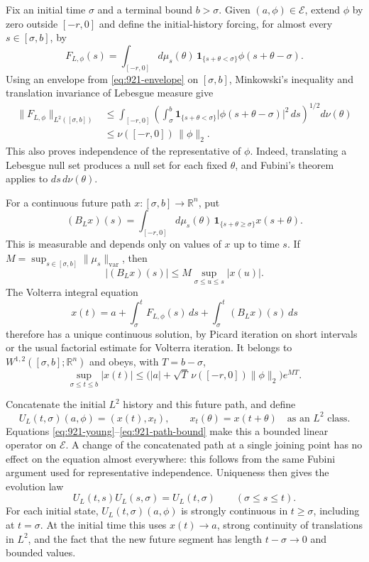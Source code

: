 \documentclass[11pt,a4paper]{article}
\theoremstyle{remark}
\begin{document}
Fix an initial time $\sigma$ and a terminal bound $b>\sigma$. Given
$(a,\phi)\in\mathcal E$, extend $\phi$ by zero outside $[-r,0]$ and define
the initial-history forcing, for almost every $s\in[\sigma,b]$, by
\[
 F_{L,\phi}(s)=\int_{[-r,0]}d\mu_s(\theta)\,
 \mathbf1_{\{s+\theta<\sigma\}}
 \phi(s+\theta-\sigma).
 \tag{921.5}\label{eq:921-forcing}
\]
Using an envelope from
\eqref{eq:921-envelope} on $[\sigma,b]$, Minkowski's inequality and
translation invariance of Lebesgue measure give
\[
 \begin{split}
 \|F_{L,\phi}\|_{L^2([\sigma,b])}
 &\le\int_{[-r,0]}
 \left(\int_\sigma^b
   \mathbf1_{\{s+\theta<\sigma\}}
   |\phi(s+\theta-\sigma)|^2\,ds\right)^{1/2}d\nu(\theta)\\
 &\le\nu([-r,0])\,\|\phi\|_2.
 \end{split}
 \tag{921.6}\label{eq:921-young}
\]
This also proves independence of the representative of $\phi$. Indeed,
translating a Lebesgue null set produces a null set for each fixed
$\theta$, and Fubini's theorem applies to $ds\,d\nu(\theta)$.

For a continuous future path $x:[\sigma,b]\to\mathbb R^n$, put
\[
 (B_Lx)(s)=\int_{[-r,0]}d\mu_s(\theta)\,
  \mathbf1_{\{s+\theta\ge\sigma\}}x(s+\theta).
\]
This is measurable and depends only on values of $x$ up to time $s$.
If $M=\sup_{s\in[\sigma,b]}\|\mu_s\|_{\mathrm{var}}$, then
\[
 |(B_Lx)(s)|\le M\sup_{\sigma\le u\le s}|x(u)|.
 \tag{921.7}\label{eq:921-volterra-bound}
\]
The Volterra integral equation
\[
 x(t)=a+\int_\sigma^tF_{L,\phi}(s)\,ds
          +\int_\sigma^t(B_Lx)(s)\,ds
 \tag{921.8}\label{eq:921-integral-evolution}
\]
therefore has a unique continuous solution, by Picard iteration on short
intervals or the usual factorial estimate for Volterra iteration.
It belongs to $W^{1,2}([\sigma,b];\mathbb R^n)$ and obeys, with
$T=b-\sigma$,
\[
 \sup_{\sigma\le t\le b}|x(t)|
 \le\bigl(|a|+\sqrt T\,\nu([-r,0])\|\phi\|_2\bigr)e^{MT}.
 \tag{921.9}\label{eq:921-path-bound}
\]

Concatenate the initial $L^2$ history and this future path, and define
\[
 U_L(t,\sigma)(a,\phi)=(x(t),x_t),
 \qquad x_t(\theta)=x(t+\theta)\quad\text{as an }L^2\text{ class}.
 \tag{921.10}\label{eq:921-evolution}
\]
Equations \eqref{eq:921-young}--\eqref{eq:921-path-bound} make this a
bounded linear operator on $\mathcal E$. A change of the concatenated
path at a single joining point has no effect on the equation almost
everywhere: this follows from the same Fubini argument used for
representative independence. Uniqueness then gives the evolution law
\[
 U_L(t,s)U_L(s,\sigma)=U_L(t,\sigma)
 \qquad(\sigma\le s\le t).
 \tag{921.11}\label{eq:921-evolution-law}
\]
For each initial state, $U_L(t,\sigma)(a,\phi)$ is strongly continuous
in $t\ge\sigma$, including at $t=\sigma$. At the initial time this uses
$x(t)\to a$, strong continuity of translations in $L^2$, and the fact
that the new future segment has length $t-\sigma\to0$ and bounded values.
\end{document}
